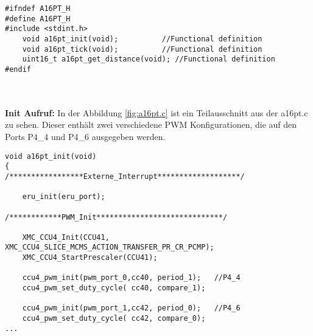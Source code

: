 \begin{minipage}{1\textwidth}
\begin{lstlisting}
#ifndef A16PT_H
#define A16PT_H
#include <stdint.h>
	void a16pt_init(void);			//Functional definition
	void a16pt_tick(void); 			//Functional definition
	uint16_t a16pt_get_distance(void); //Functional definition
#endif
\end{lstlisting}
\label{fig:a16pt.h}
\end{minipage}\\
\\
\textbf{Init Aufruf:}
In der Abbildung \ref{fig:a16pt.c} ist ein Teilausschnitt aus der a16pt.c zu sehen. Dieser enthält zwei verschiedene PWM Konfigurationen, die auf den Ports P4\_4 und P4\_6 ausgegeben werden.

\begin{minipage}{1\textwidth}
\begin{lstlisting}
void a16pt_init(void)
{
/*****************Externe_Interrupt*******************/

	eru_init(eru_port);

/************PWM_Init*****************************/

	XMC_CCU4_Init(CCU41, XMC_CCU4_SLICE_MCMS_ACTION_TRANSFER_PR_CR_PCMP);
	XMC_CCU4_StartPrescaler(CCU41);

	ccu4_pwm_init(pwm_port_0,cc40, period_1);	//P4_4
	ccu4_pwm_set_duty_cycle( cc40, compare_1);

	ccu4_pwm_init(pwm_port_1,cc42, period_0);	//P4_6
	ccu4_pwm_set_duty_cycle( cc42, compare_0);
...
\end{lstlisting}
\label{fig:a16pt.c}
\end{minipage}



